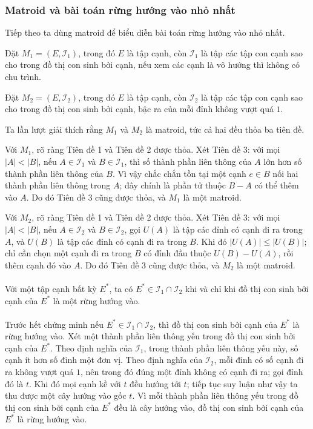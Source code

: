 \documentclass[11pt]{article}
\begin{document}
\subsubsection{Matroid và bài toán rừng hướng vào nhỏ nhất}

Tiếp theo ta dùng matroid để biểu diễn bài toán rừng hướng vào nhỏ nhất.

Đặt \(M_1=(E,\mathcal{I}_1)\), trong đó \(E\) là tập cạnh, còn
\(\mathcal{I}_1\) là tập các tập con cạnh sao cho trong đồ thị con sinh bởi
cạnh, nếu xem các cạnh là vô hướng thì không có chu trình.

Đặt \(M_2=(E,\mathcal{I}_2)\), trong đó \(E\) là tập cạnh, còn
\(\mathcal{I}_2\) là tập các tập con cạnh sao cho trong đồ thị con sinh bởi
cạnh, bậc ra của mỗi đỉnh không vượt quá \(1\).

Ta lần lượt giải thích rằng \(M_1\) và \(M_2\) là matroid, tức cả hai đều thỏa
ba tiên đề.

Với \(M_1\), rõ ràng Tiên đề 1 và Tiên đề 2 được thỏa. Xét Tiên đề 3: với mọi
\(|A|<|B|\), nếu \(A\in\mathcal{I}_1\) và \(B\in\mathcal{I}_1\), thì số thành
phần liên thông của \(A\) lớn hơn số thành phần liên thông của \(B\). Vì vậy
chắc chắn tồn tại một cạnh \(e\in B\) nối hai thành phần liên thông trong
\(A\); đây chính là phần tử thuộc \(B-A\) có thể thêm vào \(A\). Do đó Tiên đề
3 cũng được thỏa, và \(M_1\) là một matroid.

Với \(M_2\), rõ ràng Tiên đề 1 và Tiên đề 2 được thỏa. Xét Tiên đề 3: với mọi
\(|A|<|B|\), nếu \(A\in\mathcal{I}_2\) và \(B\in\mathcal{I}_2\), gọi \(U(A)\)
là tập các đỉnh có cạnh đi ra trong \(A\), và \(U(B)\) là tập các đỉnh có cạnh
đi ra trong \(B\). Khi đó \(|U(A)|\le |U(B)|\); chỉ cần chọn một cạnh đi ra
trong \(B\) có đỉnh đầu thuộc \(U(B)-U(A)\), rồi thêm cạnh đó vào \(A\). Do đó
Tiên đề 3 cũng được thỏa, và \(M_2\) là một matroid.

\paragraph{}
Với một tập cạnh bất kỳ \(E^*\), ta có
\(E^*\in\mathcal{I}_1\cap\mathcal{I}_2\) khi và chỉ khi đồ thị con sinh bởi
cạnh của \(E^*\) là một rừng hướng vào.

\paragraph{}
Trước hết chứng minh nếu \(E^*\in\mathcal{I}_1\cap\mathcal{I}_2\), thì đồ thị
con sinh bởi cạnh của \(E^*\) là rừng hướng vào. Xét một thành phần liên thông
yếu trong đồ thị con sinh bởi cạnh của \(E^*\). Theo định nghĩa của
\(\mathcal{I}_1\), trong thành phần liên thông yếu này, số cạnh ít hơn số đỉnh
một đơn vị. Theo định nghĩa của \(\mathcal{I}_2\), mỗi đỉnh có số cạnh đi ra
không vượt quá \(1\), nên trong đó đúng một đỉnh không có cạnh đi ra; gọi đỉnh
đó là \(t\). Khi đó mọi cạnh kề với \(t\) đều hướng tới \(t\); tiếp tục suy
luận như vậy ta thu được một cây hướng vào gốc \(t\). Vì mỗi thành phần liên
thông yếu trong đồ thị con sinh bởi cạnh của \(E^*\) đều là cây hướng vào, đồ
thị con sinh bởi cạnh của \(E^*\) là rừng hướng vào.
\end{document}
